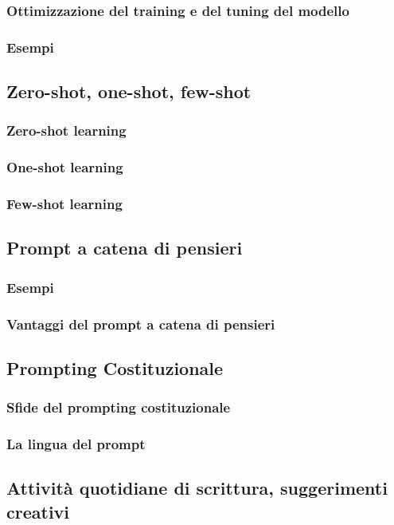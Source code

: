         \subsubsection{Ottimizzazione del training e del tuning del modello}
        \subsubsection{Esempi}
    \subsection{Zero-shot, one-shot, few-shot}
        \subsubsection{Zero-shot learning}
        \subsubsection{One-shot learning}
        \subsubsection{Few-shot learning}
    \subsection{Prompt a catena di pensieri}
        \subsubsection{Esempi}
        \subsubsection{Vantaggi del prompt a catena di pensieri}
    \subsection{Prompting Costituzionale}
        \subsubsection{Sfide del prompting costituzionale}
        \subsubsection{La lingua del prompt}
    \subsection{Attività quotidiane di scrittura, suggerimenti creativi}
